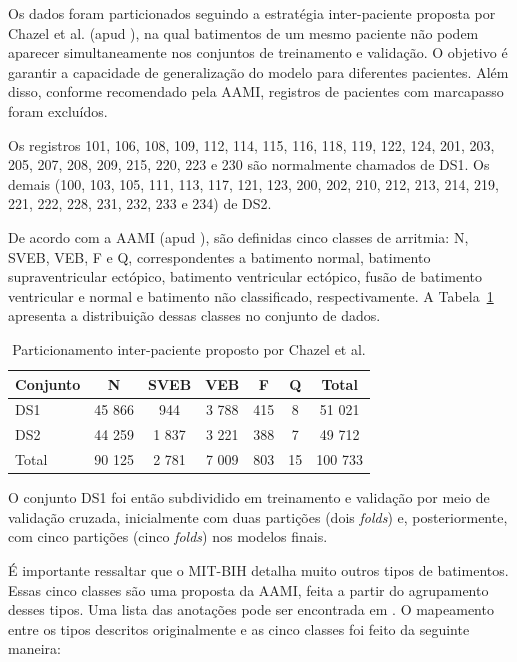 \documentclass[
    12pt,                %
    openright,           %
    oneside,             %
    a4paper,             %
    brazil               %
]{abntex2}
\begin{document}
Os dados foram particionados seguindo a estratégia inter-paciente proposta por Chazel et al. (apud ), na qual batimentos de um mesmo paciente não podem aparecer simultaneamente nos conjuntos de treinamento e validação. O objetivo é garantir a capacidade de generalização do modelo para diferentes pacientes. Além disso, conforme recomendado pela AAMI, registros de pacientes com marcapasso foram excluídos.  

Os registros 101, 106, 108, 109, 112, 114, 115, 116, 118, 119, 122, 124, 201, 203, 205, 207, 208, 209, 215, 220, 223 e 230 são normalmente chamados de DS1. Os demais (100, 103, 105, 111, 113, 117, 121, 123, 200, 202, 210, 212, 213, 214, 219, 221, 222, 228, 231, 232, 233 e 234) de DS2.

De acordo com a AAMI (apud ), são definidas cinco classes de arritmia: N, SVEB, VEB, F e Q, correspondentes a batimento normal, batimento supraventricular ectópico, batimento ventricular ectópico, fusão de batimento ventricular e normal e batimento não classificado, respectivamente. A Tabela~\ref{tab:particionamento} apresenta a distribuição dessas classes no conjunto de dados.

\begin{table}[htb]
\centering
\caption{Particionamento inter-paciente proposto por Chazel et al.}
\label{tab:particionamento}
\begin{tabular}{|l|c|c|c|c|c|c|}
\hline
Conjunto & N & SVEB & VEB & F & Q & Total \\ \hline
DS1 & 45 866 & 944 & 3 788 & 415 & 8 & 51 021 \\ \hline
DS2 & 44 259 & 1 837 & 3 221 & 388 & 7 & 49 712 \\ \hline
Total & 90 125 & 2 781 & 7 009 & 803 & 15 & 100 733 \\ \hline
\end{tabular}
\end{table}

O conjunto DS1 foi então subdividido em treinamento e validação por meio de validação cruzada, inicialmente com duas partições (dois \textit{folds}) e, posteriormente, com cinco partições (cinco \textit{folds}) nos modelos finais.  

É importante ressaltar que o MIT-BIH detalha muito outros tipos de batimentos. Essas cinco classes são uma proposta da AAMI, feita a partir do agrupamento desses tipos.
Uma lista das anotações pode ser encontrada em \cite{physionet_annotations}. O mapeamento entre os tipos descritos originalmente e as cinco classes foi feito da seguinte maneira:
\end{document}
